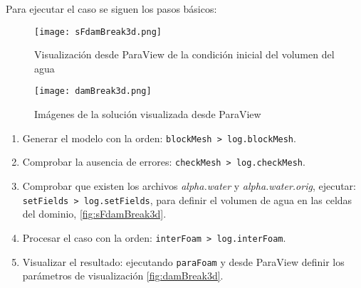 Para ejecutar el caso se siguen los pasos básicos:

\begin{figure}
\centering
\texttt{[image: sFdamBreak3d.png]}
\caption[Condición inicial del volumen del agua]{Visualización desde ParaView de la condición inicial del volumen del agua}
\label{fig:sFdamBreak3d}
\end{figure}

\begin{figure}
\centering
\texttt{[image: damBreak3d.png]}
\caption{Imágenes de la solución visualizada desde ParaView}
\label{fig:damBreak3d}
\end{figure}

\begin{enumerate}
\def\labelenumi{\arabic{enumi}.}
\item
  Generar el modelo con la orden:
  \texttt{blockMesh\ \textgreater{}\ log.blockMesh}.
\item
  Comprobar la ausencia de errores:
  \texttt{checkMesh\ \textgreater{}\ log.checkMesh}.
\item
  Comprobar que existen los archivos \emph{alpha.water} y
  \emph{alpha.water.orig}, ejecutar:
  \texttt{setFields\ \textgreater{}\ log.setFields}, para definir el volumen de agua en las celdas del dominio, \autoref{fig:sFdamBreak3d}.
\item
  Procesar el caso con la orden:
  \texttt{interFoam\ \textgreater{}\ log.interFoam}.
\item
  Visualizar el resultado: ejecutando \texttt{paraFoam} y desde ParaView definir los parámetros de visualización \autoref{fig:damBreak3d}.
\end{enumerate}
